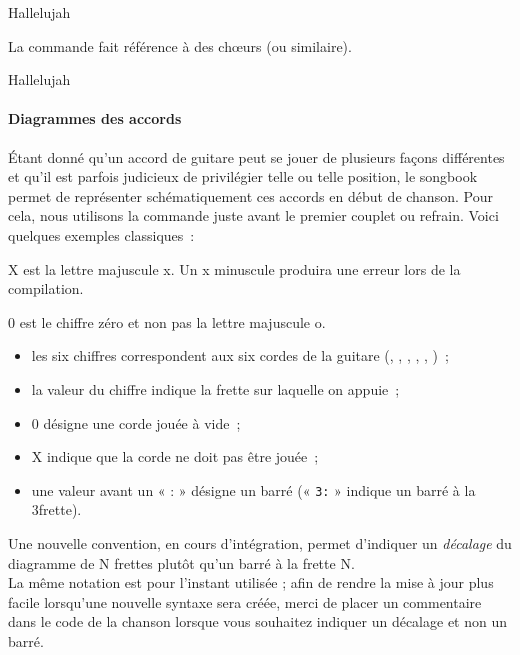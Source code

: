 \begin{songbook}
Hallelujah 
\end{songbook}

La commande  fait référence à des chœurs (ou
similaire).

\begin{songbook}
Hallelujah 
\end{songbook}

\paragraph{Diagrammes des accords}
Étant donné qu'un accord de guitare peut se jouer de plusieurs façons
différentes et qu'il est parfois judicieux de privilégier telle ou
telle position, le songbook permet de représenter schématiquement ces
accords en début de chanson. Pour cela, nous utilisons la commande
 juste avant le premier couplet ou refrain. Voici
quelques exemples classiques~:

\begin{songbook}
\end{songbook}

\begin{nota}
  X est la lettre majuscule x. Un x minuscule produira une erreur lors de la compilation.

  0 est le chiffre zéro et non pas la lettre majuscule o.
\end{nota}

\begin{itemize}
\item les six chiffres correspondent aux six cordes de la guitare
  (, , , ,
  , )~;
\item la valeur du chiffre indique la frette sur laquelle on
  appuie~;
\item 0 désigne une corde jouée à vide~;
\item X indique que la corde ne doit pas être jouée~;
\item une valeur avant un « : » désigne un barré (« \verb|3:| » indique
  un barré à la 3\ieme frette).
\end{itemize}

\begin{nota}
  Une nouvelle convention, en cours d'intégration, permet d'indiquer un
  \emph{décalage} du diagramme de N frettes plutôt qu'un barré à la
  frette N.\\
  La même notation est pour l'instant utilisée ; afin de rendre la mise à
  jour plus facile lorsqu'une nouvelle syntaxe sera créée, merci de
  placer un commentaire dans le code de la chanson lorsque vous souhaitez
  indiquer un décalage et non un barré.
\end{nota}

